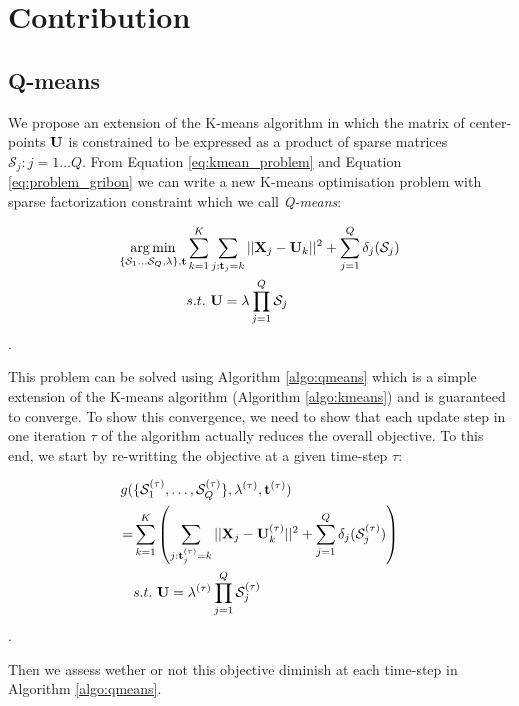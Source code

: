 \section{Contribution}

\subsection{Q-means}

We propose an extension of the K-means algorithm in which the matrix of center-points ${\mathbf{U}}$ is constrained to be expressed as a product of sparse matrices $\mathcal{S}_j: j = 1 \ldots Q$. From Equation \ref{eq:kmean_problem} and Equation \ref{eq:problem_gribon} we can write a new K-means optimisation problem with sparse factorization constraint which we call \textit{Q-means}:

\begin{equation}
\begin{split}
\label{eq:qmean_problem}
    \operatorname*{arg\,min}_{\{\mathcal{S}_1 \dots \mathcal{S}_Q, \lambda\}, {\mathbf{t}}} & \sum_{k=1}^{K} \sum_{j: {\mathbf{t}}_j = k} ||{\mathbf{X}}_j -{\mathbf{U}}_k||^2 + \sum_{j=1}^{Q} \delta_j(\mathcal{S}_j) \\
    & s.t. ~ {\mathbf{U}} = \lambda \prod_{j=1}^{Q}{\mathcal{S}_j}
\end{split}
\end{equation}.

This problem can be solved using Algorithm \ref{algo:qmeans} which is a simple extension of the K-means algorithm (Algorithm \ref{algo:kmeans}) and is guaranteed to converge. To show this convergence, we need to show that each update step in one iteration $\tau$ of the algorithm actually reduces the overall objective. To this end, we start by re-writting the objective at a given time-step $\tau$:

\begin{equation}
\begin{split}
\label{eq:qmean_problem_2}
    g(&\{ \mathcal{S}_1^{(\tau)}, \ldots,\mathcal{S}_Q^{(\tau)} \}, \lambda^{(\tau)}, {\mathbf{t}}^{(\tau)})\\
    = & \sum_{k=1}^{K} \left( \sum_{j: {\mathbf{t}}^{(\tau)}_j = k} ||{\mathbf{X}}_j - {\mathbf{U}}^{(\tau)}_k||^2 + \sum_{j=1}^{Q} \delta_j(\mathcal{S}_j^{(\tau)}) \right)\\
    & s.t. ~ {\mathbf{U}} = \lambda^{(\tau)} \prod_{j=1}^{Q}{\mathcal{S}_j^{(\tau)}}
\end{split}
\end{equation}.

Then we assess wether or not this objective diminish at each time-step in Algorithm \ref{algo:qmeans}.

